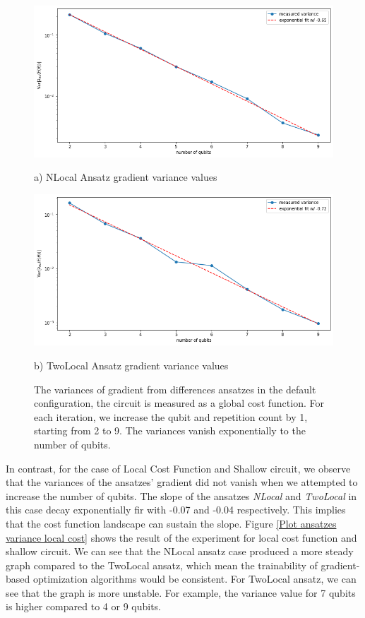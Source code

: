 \begin{figure}
    \includegraphics[width=\textwidth]{Artefact/Appendices/NLocalDefault.png}
    \centerline{a) NLocal Ansatz gradient variance values}
    \includegraphics[width=\textwidth]{Artefact/Appendices/TwoLocalDefault.png}
    \centerline{b) TwoLocal Ansatz gradient variance values}
    \caption{
        The variances of gradient from differences ansatzes in the default configuration, the circuit is measured as a global cost function.
        For each iteration, we increase the qubit and repetition count by 1, starting from 2 to 9.
        The variances vanish exponentially to the number of qubits.
    }
    \label{Plot ansatzes variance default}
\end{figure}

In contrast, for the case of Local Cost Function and Shallow circuit, we observe that the variances of the ansatzes' gradient did not vanish when we attempted to increase the number of qubits.
The slope of the ansatzes \emph{NLocal} and \emph{TwoLocal} in this case decay exponentially fir with -0.07 and -0.04 respectively.
This implies that the cost function landscape can sustain the slope.
Figure \ref{Plot ansatzes variance local cost} shows the result of the experiment for local cost function and shallow circuit.
We can see that the NLocal ansatz case produced a more steady graph compared to the TwoLocal ansatz, which mean the trainability of gradient-based optimization algorithms would be consistent.
For TwoLocal ansatz, we can see that the graph is more unstable. 
For example, the variance value for 7 qubits is higher compared to 4 or 9 qubits.

